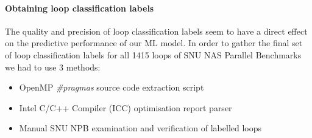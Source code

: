 \documentclass[10pt,a4paper]{report}
\begin{document}
\paragraph{Obtaining loop classification labels}
The quality and precision of loop classification labels seem to have a direct effect on the predictive performance of our ML model. In order to gather the final set of loop classification labels for all 1415 loops of SNU NAS Parallel Benchmarks we had to use 3 methods:
\begin{itemize}
\renewcommand\labelitemi{$\bullet$}
\item OpenMP \textit{#pragmas} source code extraction script
\item Intel C/C++ Compiler (ICC) optimisation report parser \cite{github-icc-parser}
\item Manual SNU NPB examination and verification of labelled loops
\end{itemize}
\end{document}
